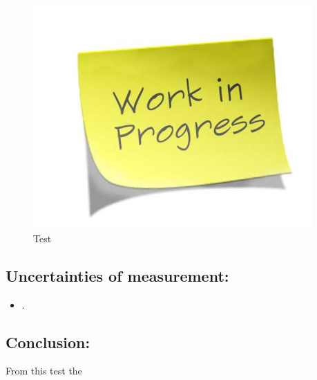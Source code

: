 \begin{figure}[H]
\includegraphics[width=0.95\textwidth]{rapport/pictures/missingfigure}
\caption{Test}
\label{fig:Test}
\end{figure}


\subsection*{Uncertainties of measurement:}
\begin{itemize}
\item .
\end{itemize}

\subsection*{Conclusion:}
From this test the 